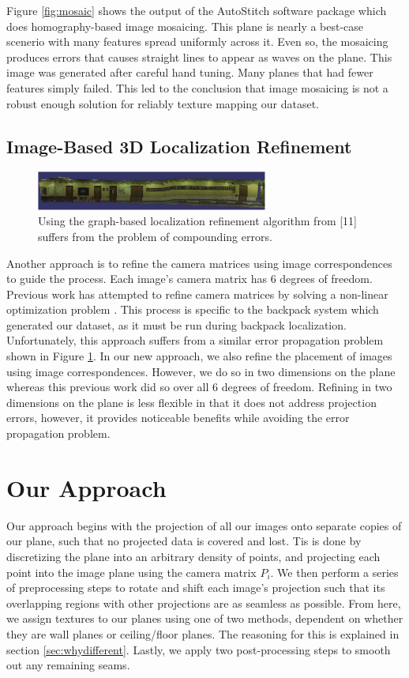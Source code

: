 \documentclass[10pt,twocolumn,letterpaper]{article}
\begin{document}
Figure \ref{fig:mosaic} shows the output of the AutoStitch software
package which does homography-based image mosaicing. This plane is
nearly a best-case scenerio with many features spread uniformly across
it. Even so, the mosaicing produces errors that causes straight lines
to appear as waves on the plane. This image was generated after
careful hand tuning. Many planes that had fewer features simply
failed. This led to the conclusion that image mosaicing is not a
robust enough solution for reliably texture mapping our dataset.

\subsection{Image-Based 3D Localization Refinement}

\begin{figure}
  \centering
  \includegraphics[width=3in]{Graph_crop.pdf}
  \caption{Using the graph-based localization refinement algorithm
    from [11] suffers from the problem of compounding errors. }
  \label{fig:graph}
\end{figure}

Another approach is to refine the camera matrices using image
correspondences to guide the process. Each image's camera matrix has 6
degrees of freedom. Previous work has attempted to refine camera
matrices by solving a non-linear optimization problem
\cite{liu2010indoor}. This process is specific to the backpack system
which generated our dataset, as it must be run during backpack
localization\cite{liu2010indoor,chen2010indoor}. Unfortunately, this
approach suffers from a similar error propagation problem shown in
Figure \ref{fig:graph}. In our new approach, we also refine the
placement of images using image correspondences. However, we do so in
two dimensions on the plane whereas this previous work did so over all
6 degrees of freedom. Refining in two dimensions on the plane is less
flexible in that it does not address projection errors, however, it
provides noticeable benefits while avoiding the error propagation
problem.


\section{Our Approach}
Our approach begins with the projection of all our images onto
separate copies of our plane, such that no projected data is covered
and lost. Tis is done by discretizing the plane into an arbitrary
density of points, and projecting each point into the image plane
using the camera matrix $P_i$. We then perform a series of
preprocessing steps to rotate and shift each image's projection such
that its overlapping regions with other projections are as seamless as
possible. From here, we assign textures to our planes using one of two
methods, dependent on whether they are wall planes or ceiling/floor
planes. The reasoning for this is explained in section
\ref{sec:whydifferent}. Lastly, we apply two post-processing steps to
smooth out any remaining seams.
\end{document}
